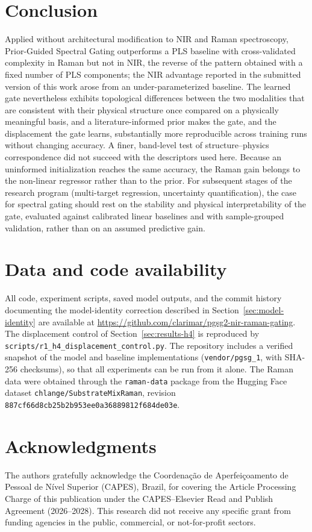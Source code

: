 \documentclass[preprint,12pt]{elsarticle}
\begin{document}
\section{Conclusion}

Applied without architectural modification to NIR and Raman spectroscopy, Prior-Guided Spectral Gating outperforms a PLS baseline with cross-validated complexity in Raman but not in NIR, the reverse of the pattern obtained with a fixed number of PLS components; the NIR advantage reported in the submitted version of this work arose from an under-parameterized baseline. The learned gate nevertheless exhibits topological differences between the two modalities that are consistent with their physical structure once compared on a physically meaningful basis, and a literature-informed prior makes the gate, and the displacement the gate learns, substantially more reproducible across training runs without changing accuracy. A finer, band-level test of structure--physics correspondence did not succeed with the descriptors used here. Because an uninformed initialization reaches the same accuracy, the Raman gain belongs to the non-linear regressor rather than to the prior. For subsequent stages of the research program (multi-target regression, uncertainty quantification), the case for spectral gating should rest on the stability and physical interpretability of the gate, evaluated against calibrated linear baselines and with sample-grouped validation, rather than on an assumed predictive gain.

\section*{Data and code availability}
\label{sec:availability}
All code, experiment scripts, saved model outputs, and the commit history documenting the model-identity correction described in Section~\ref{sec:model-identity} are available at \url{https://github.com/clarimar/pgsg2-nir-raman-gating}. The displacement control of Section~\ref{sec:results-h4} is reproduced by \texttt{scripts/r1\_h4\_displacement\_control.py}. The repository includes a verified snapshot of the model and baseline implementations (\texttt{vendor/pgsg\_1}, with SHA-256 checksums), so that all experiments can be run from it alone. The Raman data were obtained through the \texttt{raman-data} package from the Hugging Face dataset \texttt{chlange/SubstrateMixRaman}, revision \texttt{887cf66d8cb25b2b953ee0a36889812f684de03e}.

\section*{Acknowledgments}
The authors gratefully acknowledge the Coordena\c{c}\~ao de Aperfei\c{c}oamento de Pessoal de N\'ivel Superior (CAPES), Brazil, for covering the Article Processing Charge of this publication under the CAPES--Elsevier Read and Publish Agreement (2026--2028). This research did not receive any specific grant from funding agencies in the public, commercial, or not-for-profit sectors.



\end{document}
